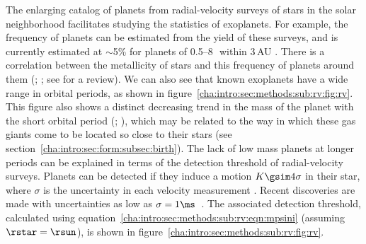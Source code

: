 The enlarging catalog of planets from radial-velocity surveys of stars in the solar neighborhood facilitates studying the statistics of exoplanets. 
For example, the frequency of planets can be estimated from the yield of these surveys, and is currently estimated at $\sim$5\% for planets of 0.5--8\,\mjup\ within 3\,AU \citep{Udry_Fischer_Queloz:PPV2007a}.
There is a correlation between the metallicity of stars and this frequency of planets around them (\citealp{Gonzalez:mnras:1997a, Fischer_Valenti:asp:2003a}; \citealp*{Santos_Israelian_Mayor:aa:2004a}; see \citealp{Gonzalez:pasp:2006a} for a review).  
We can also see that known exoplanets have a wide range in orbital periods, as shown in figure~\ref{cha:intro:sec:methods:sub:rv:fig:rv}. 
This figure also shows a distinct decreasing trend in the mass of the planet with the short orbital period (\citealp{Zucker_Mazeh:apjl:2002a}; \citealp*{Udry_Mayor_Santos:aa:2003a}), which may be related to the way in which these gas giants come to be located so close to their stars (see section~\ref{cha:intro:sec:form:subsec:birth}).
The lack of low mass planets at longer periods can be explained in terms of the detection threshold of radial-velocity surveys. 
Planets can be detected if they induce a motion $K\gsim4\sigma$ in their star, where $\sigma$ is the uncertainty in each velocity measurement \citep*{Marcy_Cochran_Mayor:PPIV:2000a}. 
Recent discoveries are made with uncertainties as low as $\sigma=1\ms$~\citep{Lovis_Mayor_Pepe:nat:2006a}. 
The associated detection threshold, calculated using equation~\ref{cha:intro:sec:methods:sub:rv:eqn:mpsini} (assuming $\rstar=\rsun$), is shown in figure~\ref{cha:intro:sec:methods:sub:rv:fig:rv}.

